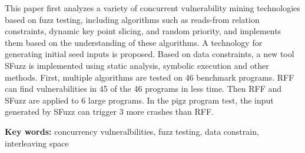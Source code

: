 This paper first analyzes a variety of concurrent vulnerability mining technologies based on fuzz testing, including algorithms such as reads-from relation constraints, dynamic key point slicing, and random priority, and implements them based on the understanding of these algorithms. A technology for generating initial seed inputs is proposed. Based on data constraints, a new tool SFuzz is implemented using static analysis, symbolic execution and other methods. First, multiple algorithms are tested on 46 benchmark programs. RFF can find vulnerabilities in 45 of the 46 programs in less time. Then RFF and SFuzz are applied to 6 large programs. In the pigz program test, the input generated by SFuzz can trigger 3 more crashes than RFF.

\textbf{Key words: } concurrency vulneralbilities, fuzz testing, data constrain, interleaving space